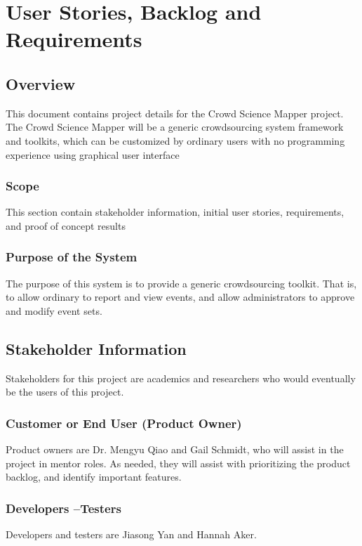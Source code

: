 \chapter{User Stories, Backlog and Requirements}
\section{Overview}

This document contains project details for the Crowd Science Mapper project. The Crowd Science Mapper will be a generic crowdsourcing system framework and toolkits, which can be customized by ordinary users with no programming experience using graphical user interface

\subsection{Scope}

This section contain stakeholder information, initial user stories, requirements, and proof of concept results

\subsection{Purpose of the System}
The purpose of this system is to provide a generic crowdsourcing toolkit. That is, to allow ordinary to report and view events, and allow administrators to approve and modify event sets.

\section{ Stakeholder Information}

Stakeholders for this project are academics and researchers who would eventually be the users of this project.

\subsection{Customer or End User (Product Owner)}

Product owners are Dr. Mengyu Qiao and Gail Schmidt, who will assist in the project in mentor roles. As needed, they will assist with prioritizing the product backlog, and identify important features.

\subsection{Developers --Testers}
Developers and testers are Jiasong Yan and Hannah Aker.

